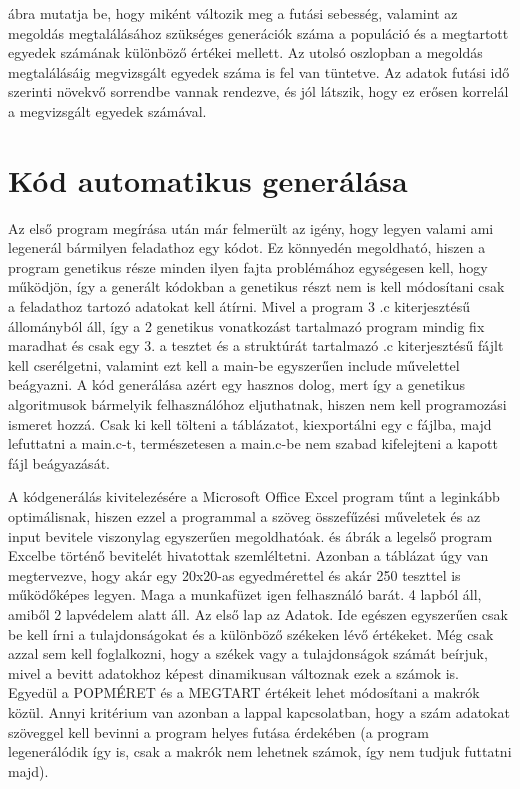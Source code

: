 \documentclass[12pt,a4paper,oneside]{report}
\begin{document}
	 ábra mutatja be, hogy miként változik meg a futási sebesség, valamint az megoldás megtalálásához szükséges generációk száma a populáció és a megtartott egyedek számának különböző értékei mellett.
	Az utolsó oszlopban a megoldás megtalálásáig megvizsgált egyedek száma is fel van tüntetve. 
	Az adatok futási idő szerinti növekvő sorrendbe vannak rendezve, és jól látszik, hogy ez erősen korrelál a megvizsgált egyedek számával. 


    

	


	

	

\chapter{Kód automatikus generálása} %
    Az első program megírása után már felmerült az igény, hogy legyen valami ami legenerál bármilyen feladathoz egy kódot.
    Ez könnyedén megoldható, hiszen a program genetikus része minden ilyen fajta problémához egységesen kell, hogy működjön, így a generált kódokban a genetikus részt nem is kell módosítani csak a feladathoz tartozó adatokat kell átírni.
    Mivel a program 3 .c kiterjesztésű állományból áll, így a 2 genetikus vonatkozást tartalmazó program mindig fix maradhat és csak egy 3. a tesztet és a struktúrát tartalmazó .c kiterjesztésű fájlt kell cserélgetni, valamint ezt kell a main-be egyszerűen include művelettel beágyazni.
    A kód generálása azért egy hasznos dolog, mert így a genetikus algoritmusok bármelyik felhasználóhoz eljuthatnak, hiszen nem kell programozási ismeret hozzá.
    Csak ki kell tölteni a táblázatot, kiexportálni egy c fájlba, majd lefuttatni a main.c-t, természetesen a main.c-be nem szabad kifelejteni a kapott fájl beágyazását.
    
    
    A kódgenerálás kivitelezésére a Microsoft Office Excel program tűnt a leginkább optimálisnak, hiszen ezzel a programmal a szöveg összefűzési műveletek és az input bevitele viszonylag egyszerűen megoldhatóak.
     és  ábrák a legelső program Excelbe történő bevitelét hivatottak szemléltetni.
    Azonban a táblázat úgy van megtervezve, hogy akár egy 20x20-as egyedmérettel és akár 250 teszttel is működőképes legyen.
    Maga a munkafüzet igen felhasználó barát. 4 lapból áll, amiből 2 lapvédelem alatt áll.
    Az első lap az Adatok.
    Ide egészen egyszerűen csak be kell írni a tulajdonságokat és a különböző székeken lévő értékeket.
    Még csak azzal sem kell foglalkozni, hogy a székek vagy a tulajdonságok számát beírjuk, mivel a bevitt adatokhoz képest dinamikusan változnak ezek a számok is.
    Egyedül a POPMÉRET és a MEGTART értékeit lehet módosítani a makrók közül.
    Annyi kritérium van azonban a lappal kapcsolatban, hogy a szám adatokat szöveggel kell bevinni a program helyes futása érdekében (a program legenerálódik így is, csak a makrók nem lehetnek számok, így nem tudjuk futtatni majd).
\end{document}
